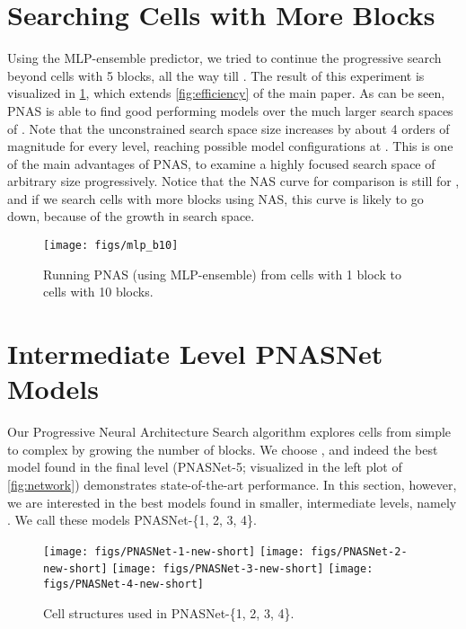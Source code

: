 \documentclass[runningheads]{llncs}
\begin{document}
\section{Searching Cells with More Blocks}

Using the MLP-ensemble predictor, we tried to continue the progressive search beyond cells with 5 blocks, all the way till .
The result of this experiment is visualized in \cref{fig:b10}, which extends \cref{fig:efficiency} of the main paper.
As can be seen, PNAS is able to find good performing models over the much larger search spaces of . Note that the unconstrained search space size increases by about 4 orders of magnitude for every  level, reaching  possible model configurations at . This is one of the main advantages of PNAS, to examine a highly focused search space of arbitrary size progressively.
Notice that the NAS curve for comparison is still for , and if we search cells with more blocks using NAS, this curve is likely to go down, because of the growth in search space.

\begin{figure}[h]
\centering 
\texttt{[image: figs/mlp\_b10]}
\caption{Running PNAS (using MLP-ensemble) from cells with 1 block to cells with 10 blocks.}
\label{fig:b10}
\end{figure}

\section{Intermediate Level PNASNet Models}

Our Progressive Neural Architecture Search algorithm explores cells from simple to complex by growing the number of blocks.
We choose , and indeed the best model found in the final level (PNASNet-5; visualized in the left plot of \cref{fig:network}) demonstrates state-of-the-art performance.
In this section, however, we are interested in the best models found in smaller, intermediate levels, namely .
We call these models PNASNet-\{1, 2, 3, 4\}.

\begin{figure}[h]
\centering
\texttt{[image: figs/PNASNet-1-new-short]}
\texttt{[image: figs/PNASNet-2-new-short]}
\texttt{[image: figs/PNASNet-3-new-short]}
\texttt{[image: figs/PNASNet-4-new-short]}
\caption{Cell structures used in PNASNet-\{1, 2, 3, 4\}.}
\label{fig:pnasnets}
\end{figure}
\end{document}
